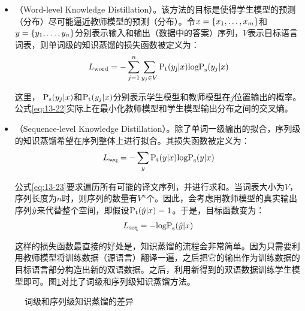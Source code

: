 \begin{itemize}
\vspace{0.5em}
\item {\small{}}（Word-level Knowledge Distillation）。该方法的目标是使得学生模型的预测（分布）尽可能逼近教师模型的预测（分布）。令${x}=\{x_1,\ldots,x_m\}$和${y}=\{y_1,\ldots,y_n\}$分别表示输入和输出（数据中的答案）序列，$V$表示目标语言词表，则单词级的知识蒸馏的损失函数被定义为：
\begin{eqnarray}
L_{\textrm{word}} = - \sum_{j=1}^n \sum_{y_j \in V} \textrm{P}_{\textrm{t}} (y_{\textrm{j}}|{x})\textrm{logP}_{\textrm{s}}(y_j|{x})
\label{eq:13-22}
\end{eqnarray}

这里， $\textrm{P}_{\textrm{s}}(y_j|{x})$和$\textrm{P}_{\textrm{t}} (y_j|{x})$分别表示学生模型和教师模型在$j$位置输出的概率。公式\eqref{eq:13-22}实际上在最小化教师模型和学生模型输出分布之间的交叉熵。
\vspace{0.5em}
\item {\small{}}（Sequence-level Knowledge Distillation）。除了单词一级输出的拟合，序列级的知识蒸馏希望在序列整体上进行拟合。其损失函数被定义为：
\begin{eqnarray}
L_{\textrm{seq}} = - \sum_{{y}}\textrm{P}_{\textrm{t}} ({y}|{x})\textrm{logP}_{\textrm{s}}({y}|{x})
\label{eq:13-23}
\end{eqnarray}

公式\eqref{eq:13-23}要求遍历所有可能的译文序列，并进行求和。当词表大小为$V$，序列长度为$n$时，则序列的数量有$V^n$个。因此，会考虑用教师模型的真实输出序列$\hat{{y}}$来代替整个空间，即假设$\textrm{P}_{\textrm{t}}(\hat{{y}}|{x})=1$。于是，目标函数变为：
\begin{eqnarray}
L_{\textrm{seq}} = - \textrm{logP}_{\textrm{s}}(\hat{{y}} | {x})
\label{eq:13-24}
\end{eqnarray}

这样的损失函数最直接的好处是，知识蒸馏的流程会非常简单。因为只需要利用教师模型将训练数据（源语言）翻译一遍，之后把它的输出作为训练数据的目标语言部分构造出新的双语数据。之后，利用新得到的双语数据训练学生模型即可。图\ref{fig:13-12}对比了词级和序列级知识蒸馏方法。
\vspace{0.5em}
\end{itemize}

\begin{figure}[htp]
\centering

\caption{词级和序列级知识蒸馏的差异}
\label{fig:13-12}
\end{figure}

